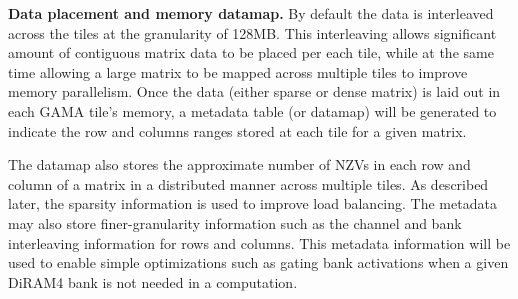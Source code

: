 \vspace{3pt}
\noindent
\textbf{Data placement and memory datamap.} 
By default the data is interleaved across the tiles at the granularity of 128MB. 
This interleaving allows significant amount of contiguous matrix data to be placed per each tile, while at the same time allowing a large matrix to be mapped across multiple tiles to improve memory parallelism.   
Once the data (either sparse or dense matrix) is laid out in each GAMA tile's memory, 
a metadata table (or datamap) will be generated to indicate the row and columns ranges stored at each tile for a given matrix.   

The datamap also stores the  approximate number of NZVs in each row and column of a matrix in a distributed manner across multiple tiles. 
As described later, the sparsity information is used to improve load balancing.     
The metadata may also store finer-granularity information such as the channel and bank interleaving information for rows and columns. 
This metadata information will be used to enable simple optimizations such as gating bank activations 
when a given DiRAM4 bank is not needed in a computation.    
%




 
